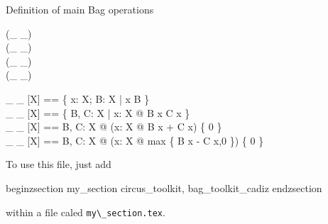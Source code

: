 \documentclass[draft,a4paper,10pt,wd]{article}
\begin{document}
Definition of main Bag operations 


\begin{zed}
\relation (\_ \inbag \_) \\
\relation (\_ \subbageq \_) \\
 \leftassoc (\_ \uplus \_) \\
 \leftassoc (\_ \uminus \_)
\end{zed}
\begin{zed}
    \_ \inbag \_ [X] == \{ x: X; B: \bag X | x \in \dom B \} \\
    \_ \subbageq \_ [X] == \{ B, C: \bag X | \forall x: X @ B \bcount x \leq C \bcount x \} \\
    \_ \uplus \_ [X] == \lambda B, C: \bag X @ (\lambda x: X @ B \bcount x + C \bcount x) \nrres \{ 0 \} \\
    \_ \uminus \_ [X] == \lambda B, C: \bag X @ (\lambda x: X @ max \{ B \bcount x - C \bcount x,0 \}) \nrres \{ 0 \}
\end{zed}

To use this file, just add  

begin{zsection}
\SECTION my\_section \parents circus\_toolkit, bag\_toolkit\_cadiz
end{zsection}

within a file caled \verb'my\_section.tex'.
\end{document}
